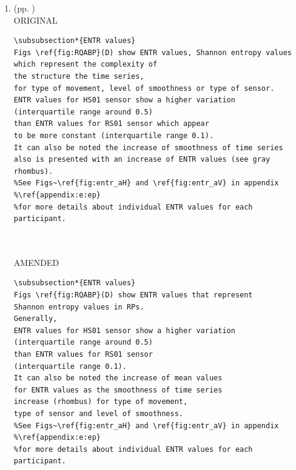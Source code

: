 \documentclass[10pt]{article}
\begin{document}
\begin{enumerate}
\begin{verbatim}
\subsubsection*{RATIO values}
Figs \ref{fig:RQABP}(C) illustrate RATIO values that represent the 
dynamic transitions in RPs. 
Generally, it can be seen that RATIO values for HS01 sensor vary less 
for HN movements (interquartile range around 2)
than HF movements (interquartile range around 5).
For faster movements (HF and VF), it can be noted a decrease of 
the mean values the smoothness of the time series 
is increasing (rhombus). However, for normal movements (HN and VN), 
the decrease of mean values is less evident than 
faster movements (rhombus).
%See Figs~\ref{fig:ratio_aH} and \ref{fig:ratio_aV} in appendix 
%\ref{appendix:e:ep} 
%for more details about individual RATIO values for each participant.


\end{verbatim}

\textit{
LOG: \\ 
Mon 13 Apr 17:45:43 BST 2020
}
\\




\item  (pp. ) \\
ORIGINAL
\begin{verbatim}
\subsubsection*{ENTR values}
Figs \ref{fig:RQABP}(D) show ENTR values, Shannon entropy values 
which represent the complexity of 
the structure the time series, 
for type of movement, level of smoothness or type of sensor.
ENTR values for HS01 sensor show a higher variation  
(interquartile range around 0.5)
than ENTR values for RS01 sensor which appear 
to be more constant (interquartile range 0.1).
It can also be noted the increase of smoothness of time series 
also is presented with an increase of ENTR values (see gray rhombus).
%See Figs~\ref{fig:entr_aH} and \ref{fig:entr_aV} in appendix
%\ref{appendix:e:ep}
%for more details about individual ENTR values for each participant.



\end{verbatim}

AMENDED
\begin{verbatim}
\subsubsection*{ENTR values}
Figs \ref{fig:RQABP}(D) show ENTR values that represent 
Shannon entropy values in RPs. 
Generally, 
ENTR values for HS01 sensor show a higher variation  
(interquartile range around 0.5)
than ENTR values for RS01 sensor 
(interquartile range 0.1).
It can also be noted the increase of mean values 
for ENTR values as the smoothness of time series 
increase (rhombus) for type of movement, 
type of sensor and level of smoothness.  
%See Figs~\ref{fig:entr_aH} and \ref{fig:entr_aV} in appendix
%\ref{appendix:e:ep}
%for more details about individual ENTR values for each participant.



\end{verbatim}
\end{enumerate}
\end{document}
